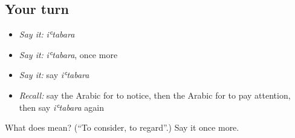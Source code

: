 \subsection*{Your turn}
\begin{itemize}
\raggedright
  \item \emph{Say it:} \emph{iʿtabara}
  \item \emph{Say it:} \emph{iʿtabara}, once more
  \item \emph{Say it:} say \emph{iʿtabara}
  \item \emph{Recall:} say the Arabic for to notice, then the Arabic for to pay attention, then say \emph{iʿtabara} again
\end{itemize}

\begin{tcolorbox}[breakable,colback=teal!4,colframe=teal!35!black,title={Before you move on}]
What does  mean? (\textquotedblleft{}To consider, to regard\textquotedblright{}.) Say it once more.
\end{tcolorbox}
